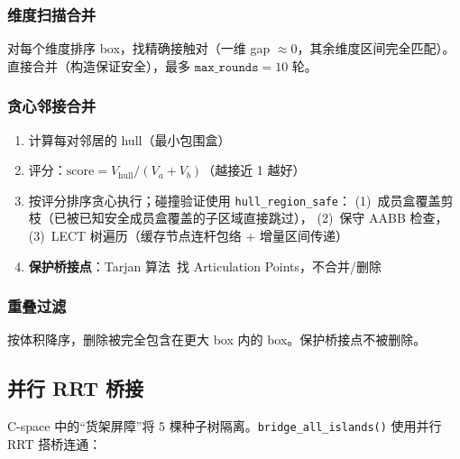 \documentclass[11pt,a4paper]{article}
\begin{document}
\subsubsection{维度扫描合并}

对每个维度排序 box，找精确接触对（一维 gap $\approx 0$，其余维度区间完全匹配）。
直接合并（构造保证安全），最多 $\texttt{max\_rounds} = 10$ 轮。

\subsubsection{贪心邻接合并}

\begin{enumerate}[nosep]
  \item 计算每对邻居的 hull（最小包围盒）
  \item 评分：$\mathrm{score} = V_{\mathrm{hull}} / (V_a + V_b)$（越接近 1 越好）
  \item 按评分排序贪心执行；碰撞验证使用 \texttt{hull\_region\_safe}：
    (1)~成员盒覆盖剪枝（已被已知安全成员盒覆盖的子区域直接跳过），
    (2)~保守 AABB 检查，(3)~LECT 树遍历（缓存节点连杆包络 + 增量区间传递）
  \item \textbf{保护桥接点}：Tarjan 算法~\cite{tarjan1972depth}找 Articulation Points，不合并/删除
\end{enumerate}

\subsubsection{重叠过滤}

按体积降序，删除被完全包含在更大 box 内的 box。保护桥接点不被删除。

\subsection{并行 RRT 桥接}
\label{sec:bridge}

C-space 中的``货架屏障''将 5 棵种子树隔离。\texttt{bridge\_all\_islands()} 使用并行 RRT 搭桥连通：
\end{document}

